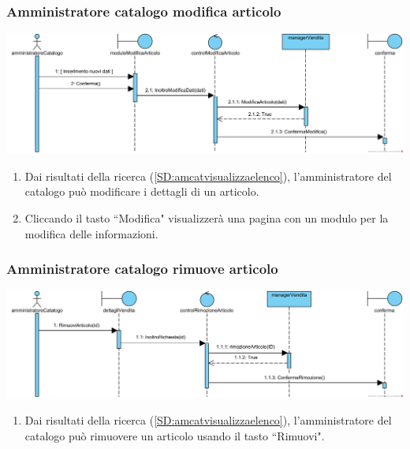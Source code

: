 \documentclass[12pt]{article}
\begin{document}
\subsubsection{Amministratore catalogo modifica articolo}
\label{SD:amcatmodificaarticolo}
\begin{center}
\includegraphics[width=\textwidth]{SequenceDiagram/AmministratoreCatalogoVenditaModifica}
\end{center}

\begin{enumerate}
\item Dai risultati della ricerca (\ref{SD:amcatvisualizzaelenco}), l'amministratore del catalogo può modificare i dettagli di un articolo.
\item Cliccando il tasto ``Modifica" visualizzerà una pagina con un modulo per la modifica delle informazioni.
\end{enumerate}

\subsubsection{Amministratore catalogo rimuove articolo}
\label{SD:amcatrimuovearticolo}
\begin{center}
\includegraphics[width=\textwidth]{SequenceDiagram/AmministratoreCatalogoVenditaRimuove}
\end{center}

\begin{enumerate}
\item Dai risultati della ricerca (\ref{SD:amcatvisualizzaelenco}), l'amministratore del catalogo può rimuovere un articolo usando il tasto ``Rimuovi".
\end{enumerate}
\end{document}
